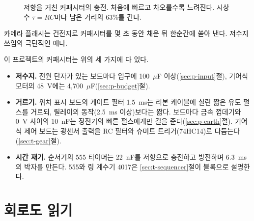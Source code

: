 \begin{figure}[ht]
\centering
{}
\caption{저항을 거친 커패시터의 충전. 처음에 빠르고 차오를수록 느려진다. 시상수 $\tau = RC$마다 남은 거리의 63\%를
간다.}
\label{fig:el-rc}
\end{figure}

\General 카메라 플래시는 건전지로 커패시터를 몇 초 동안 채운 뒤 한순간에 쏟아 낸다. 저수지 쓰임의 극단적인 예다.

\Ours 이 프로젝트의 커패시터는 위의 세 가지에 다 있다.
\begin{itemize}
\item \textbf{저수지.} 전원 단자가 있는 보드마다 입구에 100~$\mu$F 이상(\ref{sec:p-input}절), 기어식 모터의 48~V에는
4,700~$\mu$F(\ref{sec:p-budget}절).
\item \textbf{거르기.} 위치 표시 보드의 게이트 필터 1.5~ms는 리본 케이블에 실린 짧은 유도 펄스를 거르되, 릴레이의
동작(2.5~ms 이상)보다는 짧다. 보드마다 금속 껍데기와 0~V 사이의 10~nF는 정전기의 빠른 펄스에게만 길을
준다(\ref{sec:p-earth}절). 기어식 제어 보드는 광센서 출력을 RC 필터와 슈미트 트리거(74HC14)로 다듬는다
(\ref{sec:t-gear}절).
\item \textbf{시간 재기.} 순서기의 555 타이머는 22~nF를 저항으로 충전하고 방전하며 6.3~ms의 박자를 만든다. 555와 링
계수기 4017은 \ref{sec:t-sequencer}절이 블록으로 설명한다.
\end{itemize}

\section{회로도 읽기}\label{sec:el-schematic}

